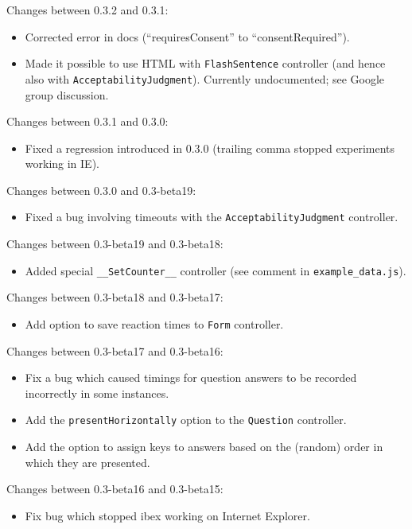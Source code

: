 \documentclass[11pt,letterpaper]{article}
\begin{document}
Changes between 0.3.2 and 0.3.1:
\begin{itemize}

\item
 Corrected error in docs (``requiresConsent'' to ``consentRequired'').
\item
 Made it possible to use HTML with \texttt{FlashSentence} controller (and hence also with \texttt{AcceptabilityJudgment}). Currently undocumented; see Google group discussion.
\end{itemize}
Changes between 0.3.1 and 0.3.0:
\begin{itemize}

\item
 Fixed a regression introduced in 0.3.0 (trailing comma stopped experiments working in IE).
\end{itemize}
Changes between 0.3.0 and 0.3-beta19:
\begin{itemize}

\item
 Fixed a bug involving timeouts with the \texttt{AcceptabilityJudgment} controller.
\end{itemize}
Changes between 0.3-beta19 and 0.3-beta18:
\begin{itemize}

\item
 Added special \texttt{\_\_SetCounter\_\_} controller (see comment in \texttt{example\_data.js}).
\end{itemize}
Changes between 0.3-beta18 and 0.3-beta17:
\begin{itemize}

\item
 Add option to save reaction times to \texttt{Form} controller.
\end{itemize}
Changes between 0.3-beta17 and 0.3-beta16:
\begin{itemize}

\item
 Fix a bug which caused timings for question answers to be recorded incorrectly in some instances.
\item
 Add the \texttt{presentHorizontally} option to the \texttt{Question} controller.
\item
 Add the option to assign keys to answers based on the (random) order in which they are presented.
\end{itemize}
Changes between 0.3-beta16 and 0.3-beta15:
\begin{itemize}

\item
 Fix bug which stopped ibex working on Internet Explorer.
\end{itemize}
\end{document}
